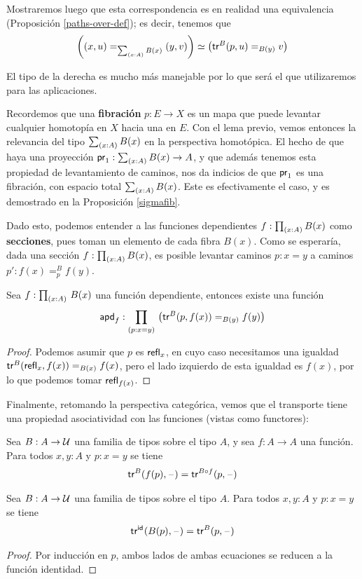 \documentclass[../main.tex]{subfiles}
\begin{document}
Mostraremos luego que esta correspondencia es en realidad una equivalencia (Proposici\'on \ref{paths-over-def}); es decir, tenemos que
\[ \eqv{\left(\id[\sm{x:A}B(x)]{(x,u)}{(y,v)}\right)}{\left(\id[B(y)]{\trfib{B}{p}{u}}{v}\right)} \]

El tipo de la derecha es mucho m\'as manejable por lo que ser\'a el que utilizaremos para las aplicaciones.

Recordemos que una \textbf{fibraci\'on} $p:E \to X$ es un mapa que puede levantar cualquier homotop\'ia en $X$ hacia una en $E$.
Con el lema previo, vemos entonces la relevancia del tipo $\tsm{x:A}B(x)$ en la perspectiva homot\'opica.
El hecho de que haya una proyecci\'on $\fst: \tsm{x:A}B(x) \to A$, y que adem\'as tenemos esta propiedad de levantamiento de caminos, nos da indicios de que $\fst$ es una fibraci\'on, con espacio total $\tsm{x:A}B(x)$.
Este es efectivamente el caso, y es demostrado en la Proposici\'on \ref{sigmafib}.

Dado esto, podemos entender a las funciones dependientes $f:\tprd{x:A}B(x)$ como \textbf{secciones}, pues toman un elemento de cada fibra $B(x)$. Como se esperar\'ia, dada una secci\'on $f:\tprd{x:A}B(x)$, es posible levantar caminos $p:x=y$ a caminos $p':f(x)=_p^B f(y)$.

\begin{lemma} \label{apd}
  Sea $f: \dprd{x:A}B(x)$ una funci\'on dependiente, entonces existe una función
  $$\apdfunc f : \dprd{p:x=y} \left(\id[B(y)]{\trfib{B}{p}{f(x)}}{f(y)}  \right) $$
\end{lemma}
\begin{proof}
  Podemos asumir que $p$ es $\refl{x}$, en cuyo caso necesitamos una igualdad $\id[B(x)]{\trfib{B}{\refl{x}}{f(x)}}{f(x)}$, pero el lado izquierdo de esta igualdad es $f(x)$, por lo que podemos tomar $\refl{f(x)}$.
\end{proof}

Finalmente, retomando la perspectiva categ\'orica, vemos que el transporte tiene una propiedad asociatividad con las funciones (vistas como functores):

\begin{lemma}\label{tr-funcs}
  Sea $B : A \to \UU$ una familia de tipos sobre el tipo $A$, y sea $f:A \to A$ una funci\'on. Para todos $x,y :A$ y $p:x=y$ se tiene
  \[ \trfib{B}{f(p)}{\blank} = \trfib{B \circ f}{p}{\blank}\]
\end{lemma}
\begin{lemma}\label{tr-funcs-id}
  Sea $B : A \to \UU$ una familia de tipos sobre el tipo $A$. Para todos $x,y :A$ y $p:x=y$ se tiene
  \[ \trfib{\idfunc}{B(p)}{\blank} = \trfib{B}{p}{\blank}\]
\end{lemma}
\begin{proof}
  Por inducción en $p$, ambos lados de ambas ecuaciones se reducen a la funci\'on identidad.
\end{proof}
\end{document}
